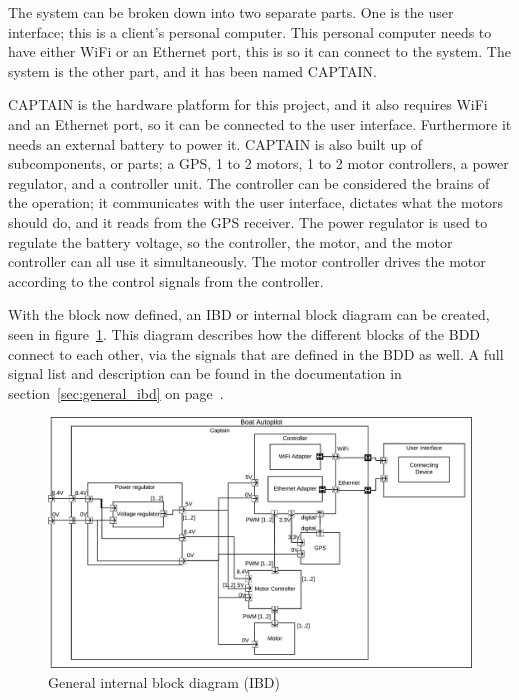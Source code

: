 The system can be broken down into two separate parts. One is the user interface; this is a client's personal computer. This personal computer needs to have either WiFi or an Ethernet port, this is so it can connect to the system. The system is the other part, and it has been named CAPTAIN. 

CAPTAIN is the hardware platform for this project, and it also requires WiFi and an Ethernet port, so it can be connected to the user interface. Furthermore it needs an external battery to power it.  CAPTAIN is also built up of subcomponents, or parts; a GPS, 1 to 2 motors, 1 to 2 motor controllers, a power regulator, and a controller unit. The controller can be considered the brains of the operation; it communicates with the user interface, dictates what the motors should do, and it reads from the GPS receiver. The power regulator is used to regulate the battery voltage, so the controller, the motor, and the motor controller can all use it simultaneously. The motor controller drives the motor according to the control signals from the controller. 

With the block now defined, an IBD or internal block diagram can be created, seen in figure~\ref{fig:generalibd}. This diagram describes how the different blocks of the BDD connect to each other, via the signals that are defined in the BDD as well. A full signal list and description can be found in the documentation in section~\ref{sec:general_ibd} on page~\pageref{sec:general_ibd}.
\begin{figure}[H]
\centering
\includegraphics[width=1\linewidth]{../Appendix/Project/Dokumentation/Images/System_architecture/General_IBD}
\caption{General internal block diagram (IBD)}
\label{fig:generalibd}
\end{figure}

